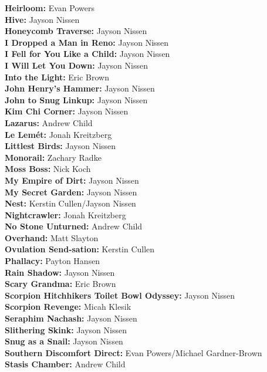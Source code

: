 \begin{flushleft}
\textbf{Heirloom:} Evan Powers\\
\textbf{Hive:} Jayson Nissen\\
\textbf{Honeycomb Traverse:} Jayson Nissen\\
\textbf{I Dropped a Man in Reno:} Jayson Nissen\\
\textbf{I Fell for You Like a Child:} Jayson Nissen\\
\textbf{I Will Let You Down:} Jayson Nissen\\
\textbf{Into the Light:} Eric Brown\\
\textbf{John Henry's Hammer:} Jayson Nissen\\
\textbf{John to Snug Linkup:} Jayson Nissen\\
\textbf{Kim Chi Corner:} Jayson Nissen\\
\textbf{Lazarus:} Andrew Child\\
\textbf{Le Lemét:} Jonah Kreitzberg\\
\textbf{Littlest Birds:} Jayson Nissen\\
\textbf{Monorail:} Zachary Radke\\
\textbf{Moss Boss:} Nick Koch\\
\textbf{My Empire of Dirt:} Jayson Nissen\\
\textbf{My Secret Garden:} Jayson Nissen\\
\textbf{Nest:} Kerstin Cullen/Jayson Nissen\\
\textbf{Nightcrawler:} Jonah Kreitzberg\\
\textbf{No Stone Unturned:} Andrew Child\\
\textbf{Overhand:} Matt Slayton\\
\textbf{Ovulation Send-sation:} Kerstin Cullen\\
\textbf{Phallacy:} Payton Hansen\\
\textbf{Rain Shadow:} Jayson Nissen\\
\textbf{Scary Grandma:} Eric Brown\\
\textbf{Scorpion Hitchhikers Toilet Bowl Odyssey:} Jayson Nissen\\
\textbf{Scorpion Revenge:} Micah Klesik\\
\textbf{Seraphim Nachash:} Jayson Nissen\\
\textbf{Slithering Skink:} Jayson Nissen\\
\textbf{Snug as a Snail:} Jayson Nissen\\
\textbf{Southern Discomfort Direct:} Evan Powers/Michael Gardner-Brown\\
\textbf{Stasis Chamber:} Andrew Child\\

\end{flushleft}
